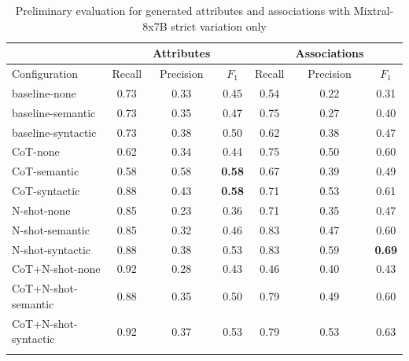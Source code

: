 \begin{table}[!h]
    \scriptsize
    \centering
    \setlength{\tabcolsep}{0.5em}
    \begin{tabular}{lcccccc}
    \toprule
         & & Attributes & & & Associations & \\
     \toprule
        Configuration & Recall & Precision & $F_1$ & Recall & Precision & $F_1$ \\
    \toprule
    
    \addlinespace
         baseline-none        & 0.73 & 0.33 & 0.45 & 0.54 & 0.22 & 0.31 \\
    	 baseline-semantic    & 0.73 & 0.35 & 0.47 & 0.75 & 0.27 & 0.40 \\
         baseline-syntactic   & 0.73 & 0.38 & 0.50 & 0.62 & 0.38 & 0.47 \\
         CoT-none             & 0.62 & 0.34 & 0.44 & 0.75 & 0.50 & 0.60 \\
         CoT-semantic         & 0.58 & 0.58 & \textbf{0.58} & 0.67 & 0.39 & 0.49 \\
         CoT-syntactic        & 0.88 & 0.43 & \textbf{0.58} & 0.71 & 0.53 & 0.61 \\
         N-shot-none          & 0.85 & 0.23 & 0.36 & 0.71 & 0.35 & 0.47 \\
         N-shot-semantic      & 0.85 & 0.32 & 0.46 & 0.83 & 0.47 & 0.60 \\
         N-shot-syntactic     & 0.88 & 0.38 & 0.53 & 0.83 & 0.59 & \textbf{0.69} \\
         CoT+N-shot-none      & 0.92 & 0.28 & 0.43 & 0.46 & 0.40 & 0.43 \\
         CoT+N-shot-semantic  & 0.88 & 0.35 & 0.50 & 0.79 & 0.49 & 0.60 \\
         CoT+N-shot-syntactic & 0.92 & 0.37 & 0.53 & 0.79 & 0.53 & 0.63 \\
    \addlinespace
    \bottomrule
    \addlinespace
    \end{tabular}
    \caption{Preliminary evaluation for generated attributes and associations with Mixtral-8x7B strict variation only}
    \label{tab:preliminary-mixtral}
\end{table}


